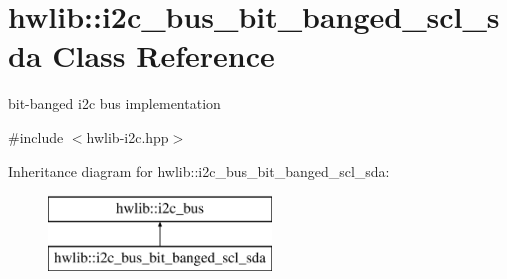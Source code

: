 \hypertarget{classhwlib_1_1i2c__bus__bit__banged__scl__sda}{}\section{hwlib\+:\+:i2c\+\_\+bus\+\_\+bit\+\_\+banged\+\_\+scl\+\_\+sda Class Reference}
\label{classhwlib_1_1i2c__bus__bit__banged__scl__sda}


bit-\/banged i2c bus implementation  




{\ttfamily \#include $<$hwlib-\/i2c.\+hpp$>$}

Inheritance diagram for hwlib\+:\+:i2c\+\_\+bus\+\_\+bit\+\_\+banged\+\_\+scl\+\_\+sda\+:\begin{figure}[H]
\begin{center}
\leavevmode
\includegraphics[height=2.000000cm]{classhwlib_1_1i2c__bus__bit__banged__scl__sda}
\end{center}
\end{figure}
